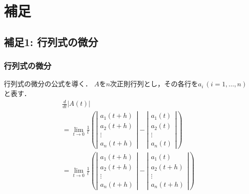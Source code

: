 \documentclass[10pt,usepdftitle=false,hyperref={unicode}]{beamer}
\newcommand{\absolute}[1]{\left|#1\right|}
\newcommand{\parentheses}[1]{\left(#1\right)}
\begin{document}
\section{補足}
\subsection{補足1: 行列式の微分}
\label{sec:det}
\begin{frame}
\frametitle{行列式の微分}
行列式の微分の公式を導く．
$A$を$n$次正則行列とし，その各行を$a_i\,\parentheses{i = 1,\ldots,n}$と表す．
\begin{align*}
    &\frac{d}{dt}\absolute{A\parentheses{t}} \\
    &= \lim_{t \to 0}\frac{1}{t}\parentheses{%
        \absolute{%
            \begin{array}{c}
                a_1\parentheses{t + h} \\
                a_2\parentheses{t + h} \\
                \vdots \\
                a_n\parentheses{t + h}
            \end{array}
        }
        -
        \absolute{%
            \begin{array}{c}
                a_1\parentheses{t} \\
                a_2\parentheses{t} \\
                \vdots \\
                a_n\parentheses{t}
            \end{array}
        }
    } \\
    &= \lim_{t \to 0}\frac{1}{t}\parentheses{%
        \absolute{%
            \begin{array}{c}
                a_1\parentheses{t + h} \\
                a_2\parentheses{t + h} \\
                \vdots \\
                a_n\parentheses{t + h}
            \end{array}
        }
        -
        \absolute{%
            \begin{array}{c}
                a_1\parentheses{t} \\
                a_2\parentheses{t + h} \\
                \vdots \\
                a_n\parentheses{t + h}
            \end{array}
}}
\end{align*}
\end{frame}
\end{document}
